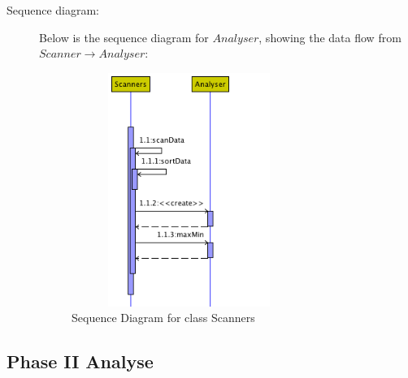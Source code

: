 \begin{description}
\begin{itemize}
\end{itemize}

\item[Sequence diagram: ] 

Below is the sequence diagram for $Analyser$, showing the data flow from $Scanner \rightarrow Analyser$:

\begin{figure}[h]
    \centering
    \includegraphics[width=3in, height=3in]{figures/sequence_scanners}
    \caption[Sequence Diagram for class Scanners]{Sequence Diagram for class Scanners}
    \label{fig:figure4_22}
\end{figure}

\end{description}

\subsection{Phase II Analyse}

